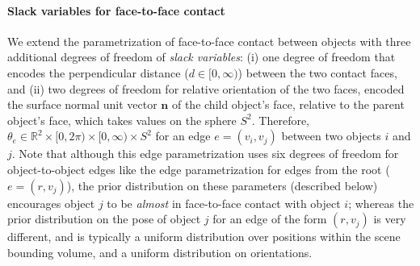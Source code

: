 \paragraph{Slack variables for face-to-face contact} \label{section:slack}
We extend the parametrization of face-to-face contact between objects with three additional degrees of freedom of \emph{slack variables}: (i) one degree of freedom that encodes the perpendicular distance ($d \in [0, \infty)$) between the two contact faces, and (ii) two degrees of freedom for relative orientation of the two faces, encoded the surface normal unit vector $\mathbf{n}$ of the child object's face, relative to the parent object's face, which takes values on the sphere $S^2$.
Therefore, $\theta_e \in \mathbb{R}^2 \times [0, 2 \pi) \times [0, \infty) \times S^2$ for an edge $e = (v_i, v_j)$ between two objects $i$ and $j$.
Note that although this edge parametrization uses six degrees of freedom for object-to-object edges like the edge parametrization for edges from the root ($e = (r, v_j)$), the prior distribution on these parameters (described below) encourages object $j$ to be \emph{almost} in face-to-face contact with object $i$; whereas the prior distribution on the pose of object $j$ for an edge of the form $(r, v_j)$ is very different, and is typically a uniform distribution over positions within the scene bounding volume, and a uniform distribution on orientations.

